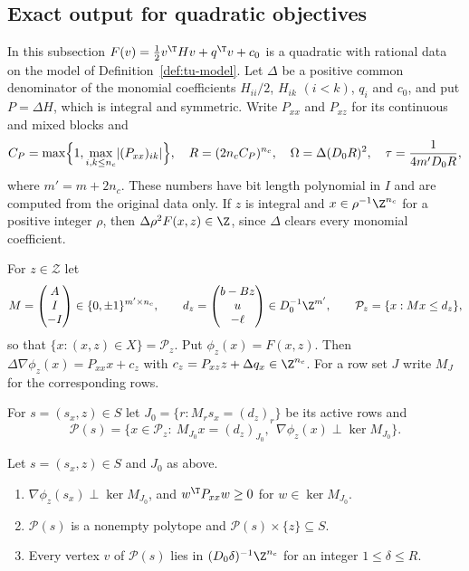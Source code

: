 \subsection{Exact output for quadratic objectives}\label{sec:tu-exact}

In this subsection $F(v)=\frac12v^{\T}Hv+q^{\T}v+c_0$ is a quadratic with
rational data on the model of Definition~\ref{def:tu-model}. Let $\Delta$ be a
positive common denominator of the monomial coefficients $H_{ii}/2$,
$H_{ik}$ $(i<k)$, $q_i$ and $c_0$, and put $P=\Delta H$, which is integral and
symmetric. Write $P_{xx}$ and $P_{xz}$ for its continuous and mixed blocks and
\[
C_P=\max\Bigl\{1,\max_{i,k\le n_c}\lvert(P_{xx})_{ik}\rvert\Bigr\},\quad
R=(2n_cC_P)^{n_c},\quad \Omega=\Delta(D_0R)^2,\quad
\tau=\frac1{4m'D_0R},
\]
where $m'=m+2n_c$. These numbers have bit length polynomial in $I$ and are
computed from the original data only. If $z$ is integral and
$x\in\rho^{-1}\Z^{n_c}$ for a positive integer $\rho$, then
$\Delta\rho^2F(x,z)\in\Z$, since $\Delta$ clears every monomial coefficient.

For $z\in\mathcal Z$ let
\[
M=\begin{pmatrix}A\\ I\\ -I\end{pmatrix}\in\{0,\pm1\}^{m'\times n_c},\qquad
d_z=\begin{pmatrix}b-Bz\\ u\\ -\ell\end{pmatrix}\in D_0^{-1}\Z^{m'},\qquad
\mathcal P_z=\{x:Mx\le d_z\},
\]
so that $\{x:(x,z)\in X\}=\mathcal P_z$. Put $\phi_z(x)=F(x,z)$. Then
$\Delta\nabla\phi_z(x)=P_{xx}x+c_z$ with $c_z=P_{xz}z+\Delta q_x\in\Z^{n_c}$. For
a row set $J$ write $M_J$ for the corresponding rows.

\begin{definition}\label{def:tu-statpoly}
For $s=(s_x,z)\in S$ let $J_0=\{r:M_rs_x=(d_z)_r\}$ be its active rows and
\[
\mathcal P(s)=\bigl\{x\in\mathcal P_z:\ M_{J_0}x=(d_z)_{J_0},\ \
\nabla\phi_z(x)\perp\ker M_{J_0}\bigr\}.
\]
\end{definition}

\begin{lemma}[Stationary face polytopes]\label{lem:tu-statpoly}
Let $s=(s_x,z)\in S$ and $J_0$ as above.
\begin{enumerate}[label=(\alph*)]
\item $\nabla\phi_z(s_x)\perp\ker M_{J_0}$, and $w^{\T}P_{xx}w\ge0$ for
$w\in\ker M_{J_0}$.
\item $\mathcal P(s)$ is a nonempty polytope and $\mathcal P(s)\times\{z\}\subseteq S$.
\item Every vertex $v$ of $\mathcal P(s)$ lies in $(D_0\delta)^{-1}\Z^{n_c}$ for an
integer $1\le\delta\le R$.
\end{enumerate}
\end{lemma}

